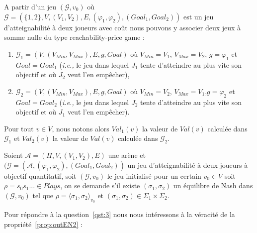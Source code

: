 A partir d'un jeu $(\mathcal{G},v_{0})$ où $\mathcal{G} =( \{ 1, 2 \}, V, (V_{1},V_{2}), E, (\varphi _{1},\varphi _{2}),(Goal_{1},Goal_{2}))$ est un jeu d'atteignabilité à deux joueurs avec coût nous pouvons y associer deux jeux à somme nulle du type \og reachability-price game \fg:
\begin{enumerate}
	\item $\mathcal{G}_{1} = (V,(V_{Min},V_{Max}),E,g,Goal)$ où $V_{Min} = V_{1}$, $V_{Max} = V_{2}$, $g = \varphi_{1}$ et $Goal = Goal_{1}$ (\emph{i.e.,} le jeu dans lequel $J_{1}$ tente d'atteindre au plus vite son objectif et où $J_{2}$ veut l'en empêcher),
	\item $\mathcal{G}_{2} = (V,(V_{Min},V_{Max}),E,g,Goal)$ où $V_{Min} = V_{2}$, $V_{Max} = V_{1}$,$g = \varphi_{2}$ et $Goal = Goal_{2}$ (\emph{i.e.,} le jeu dans lequel $J_{2}$ tente d'atteindre au plus vite son objectif et où $J_{1}$ veut l'en empêcher).
\end{enumerate}

Pour tout $v \in V$, nous notons alors $Val_{1}(v)$ la valeur de $Val(v)$ calculée dans $\mathcal{G}_{1}$ et $Val_{2}(v)$ la valeur de $Val(v)$ calculée dans $\mathcal{G}_{2}$.

\begin{qst}
	
	\label{qst:3}
	
	Soient $\mathcal{A} = (\Pi, V, (V_{1}, V_{2}), E)$ une arène et $(\mathcal{G} = (\mathcal{A}, (\varphi _{1}, \varphi _{2}), (Goal_{1}, Goal_{2}))$ un jeu d'atteignabilité à deux joueurs à objectif quantitatif, soit $(\mathcal{G}, v_{0})$ le jeu initialisé pour un certain $v_{0} \in V $ soit $\rho = s_{0}s_{1}... \in Plays$, on se demande s'il existe $(\sigma _{1},\sigma _{2})$ un équilibre de Nash dans $(\mathcal{G},v_{0})$ tel que $\rho = \langle \sigma _{1},\sigma _{2} \rangle_{v_0}$ et $(\sigma _{1},\sigma _{2}) \in \Sigma _{1} \times \Sigma _{2}.$
\end{qst}

Pour répondre à la question~\ref{qst:3} nous nous intéressons à la véracité de la propriété~\ref{prop:outEN2} :


